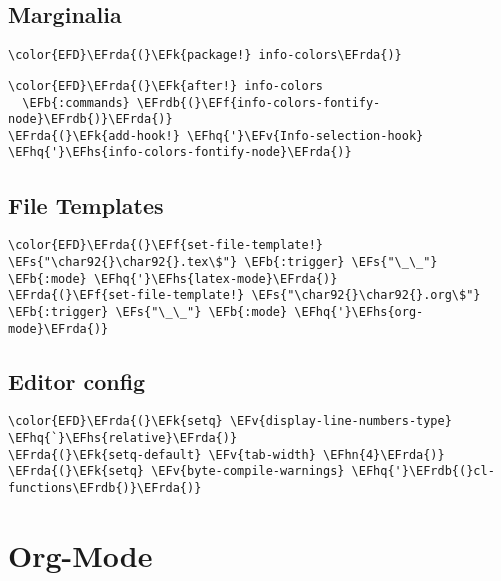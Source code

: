 \documentclass[c]{article}
\theoremstyle{plain}%
\theoremstyle{definition}
\theoremstyle{remark}
\newcommand{\EFs}[1]{\textcolor{EFs}{#1}} %
\newcommand{\EFk}[1]{\textcolor{EFk}{#1}} %
\newcommand{\EFb}[1]{\textcolor{EFb}{#1}} %
\newcommand{\EFf}[1]{\textcolor{EFf}{#1}} %
\newcommand{\EFv}[1]{\textcolor{EFv}{#1}} %
\newcommand{\EFhn}[1]{\textcolor{EFhn}{\textbf{#1}}} %
\newcommand{\EFhq}[1]{\textcolor{EFhq}{#1}} %
\newcommand{\EFhs}[1]{\textcolor{EFhs}{#1}} %
\newcommand{\EFrda}[1]{\textcolor{EFrda}{#1}} %
\newcommand{\EFrdb}[1]{\textcolor{EFrdb}{#1}} %
\begin{document}
\subsection{Marginalia}
\label{sec:org2d41e3e}
\begin{Code}
\begin{Verbatim}
\color{EFD}\EFrda{(}\EFk{package!} info-colors\EFrda{)}
\end{Verbatim}
\end{Code}
\begin{Code}
\begin{Verbatim}
\color{EFD}\EFrda{(}\EFk{after!} info-colors
  \EFb{:commands} \EFrdb{(}\EFf{info-colors-fontify-node}\EFrdb{)}\EFrda{)}
\EFrda{(}\EFk{add-hook!} \EFhq{'}\EFv{Info-selection-hook} \EFhq{'}\EFhs{info-colors-fontify-node}\EFrda{)}
\end{Verbatim}
\end{Code}
\subsection{File Templates}
\label{sec:orgad2aada}
\begin{Code}
\begin{Verbatim}
\color{EFD}\EFrda{(}\EFf{set-file-template!} \EFs{"\char92{}\char92{}.tex\$"} \EFb{:trigger} \EFs{"\_\_"} \EFb{:mode} \EFhq{'}\EFhs{latex-mode}\EFrda{)}
\EFrda{(}\EFf{set-file-template!} \EFs{"\char92{}\char92{}.org\$"} \EFb{:trigger} \EFs{"\_\_"} \EFb{:mode} \EFhq{'}\EFhs{org-mode}\EFrda{)}
\end{Verbatim}
\end{Code}
\subsection{Editor config}
\label{sec:org71feb78}
\begin{Code}
\begin{Verbatim}
\color{EFD}\EFrda{(}\EFk{setq} \EFv{display-line-numbers-type} \EFhq{`}\EFhs{relative}\EFrda{)}
\EFrda{(}\EFk{setq-default} \EFv{tab-width} \EFhn{4}\EFrda{)}
\EFrda{(}\EFk{setq} \EFv{byte-compile-warnings} \EFhq{'}\EFrdb{(}cl-functions\EFrdb{)}\EFrda{)}
\end{Verbatim}
\end{Code}
\section{Org-Mode}
\label{sec:org1ff1674}
\end{document}
